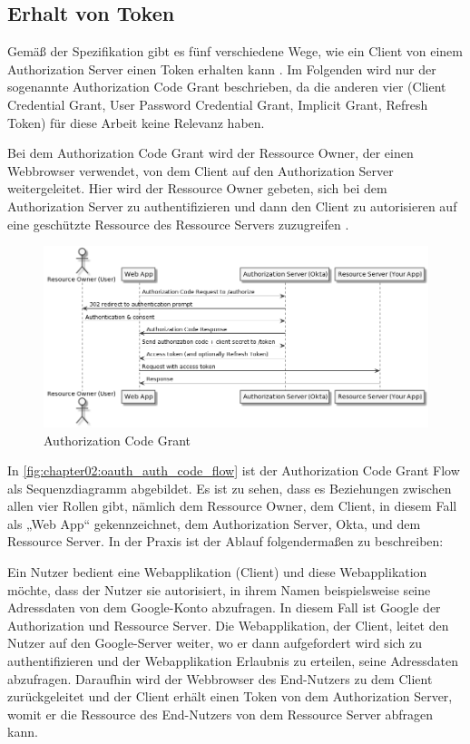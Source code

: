 \subsection{Erhalt von Token}
\label{subsec:OAuth2:ErhaltvonToken}

Gemäß der Spezifikation gibt es fünf verschiedene Wege, wie ein Client von einem Authorization Server einen Token erhalten kann \citep{oauth2:2012}. Im Folgenden wird nur der sogenannte Authorization Code Grant beschrieben, da die anderen vier (Client Credential Grant, User Password Credential Grant, Implicit Grant, Refresh Token) für diese Arbeit keine Relevanz haben.\smallskip

Bei dem Authorization Code Grant wird der Ressource Owner, der einen Webbrowser verwendet, von dem Client auf den Authorization Server weitergeleitet. Hier wird der Ressource Owner gebeten, sich bei dem Authorization Server zu authentifizieren und dann den Client zu autorisieren auf eine geschützte Ressource des Ressource Servers zuzugreifen \citep{oauth2:2012}. 

\begin{figure}[!htb]
  \centering
  \includegraphics[width=1.0\textwidth]{gfx/oauth_auth_code_flow.png}
  \caption[Authorization Code Grant]{Authorization Code Grant \citep{okta:2020}}
  \label{fig:chapter02:oauth_auth_code_flow}
\end{figure}

In \autoref{fig:chapter02:oauth_auth_code_flow} ist der Authorization Code Grant Flow als Sequenzdiagramm abgebildet. Es ist zu sehen, dass es Beziehungen zwischen allen vier Rollen gibt, nämlich dem Ressource Owner, dem Client, in diesem Fall als „Web App“ gekennzeichnet, dem Authorization Server, Okta, und dem Ressource Server. 
In der Praxis ist der Ablauf folgendermaßen zu beschreiben:\smallskip

Ein Nutzer bedient eine Webapplikation (Client) und diese Webapplikation möchte, dass der Nutzer sie autorisiert, in ihrem Namen beispielsweise seine Adressdaten von dem Google-Konto abzufragen. In diesem Fall ist Google der Authorization und Ressource Server. Die Webapplikation, der Client, leitet den Nutzer auf den Google-Server weiter, wo er dann aufgefordert wird sich zu authentifizieren und der Webapplikation Erlaubnis zu erteilen, seine Adressdaten abzufragen. Daraufhin wird der Webbrowser des End-Nutzers zu dem Client zurückgeleitet und der Client erhält einen Token von dem Authorization Server, womit er die Ressource des End-Nutzers von dem Ressource Server abfragen kann. 


